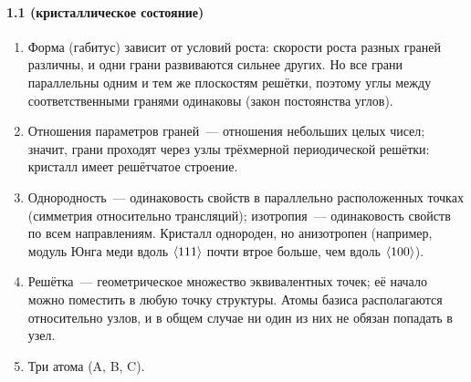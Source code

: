 {\small
\paragraph{1.1 (кристаллическое состояние)}
\begin{enumerate}[label=\arabic*.]
\item Форма (габитус) зависит от условий роста: скорости роста разных
граней различны, и одни грани развиваются сильнее других. Но все грани
параллельны одним и тем же плоскостям решётки, поэтому углы между
соответственными гранями одинаковы (закон постоянства углов).
\item Отношения параметров граней~— отношения небольших целых чисел;
значит, грани проходят через узлы трёхмерной периодической решётки:
кристалл имеет решётчатое строение.
\item Однородность~— одинаковость свойств в параллельно расположенных
точках (симметрия относительно трансляций); изотропия~— одинаковость
свойств по всем направлениям. Кристалл однороден, но анизотропен
(например, модуль Юнга меди вдоль $\langle 111\rangle$ почти втрое больше, чем
вдоль $\langle 100\rangle$).
\item Решётка~— геометрическое множество эквивалентных точек; её начало
можно поместить в любую точку структуры. Атомы базиса располагаются
относительно узлов, и в общем случае ни один из них не обязан попадать
в узел.
\item Три атома (A, B, C).
\end{enumerate}

}
